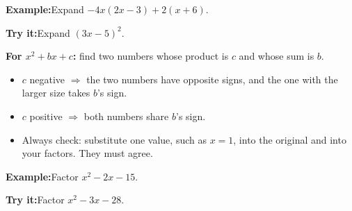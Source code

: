 \documentclass[12pt]{article}
\begin{document}
\begin{examplebox}
\textbf{Example:}\quad Expand $-4x(2x - 3) + 2(x + 6)$.
\end{examplebox}

\begin{tryitbox}
\textbf{Try it:}\quad Expand $(3x - 5)^2$.\\[2pt]
\end{tryitbox}


\begin{formulabox}
\textbf{For $x^2 + bx + c$:} find two numbers whose product is $c$ and whose sum is $b$.
\begin{itemize}[leftmargin=0.8cm, itemsep=0pt, topsep=1pt]
  \item $c$ negative $\Rightarrow$ the two numbers have opposite signs, and the one with the larger size takes $b$'s sign.
  \item $c$ positive $\Rightarrow$ both numbers share $b$'s sign.
  \item Always check: substitute one value, such as $x = 1$, into the original and into your factors. They must agree.
\end{itemize}
\end{formulabox}

\begin{examplebox}
\textbf{Example:}\quad Factor $x^2 - 2x - 15$.
\end{examplebox}

\begin{tryitbox}
\textbf{Try it:}\quad Factor $x^2 - 3x - 28$.\\[2pt]
\end{tryitbox}
\end{document}
